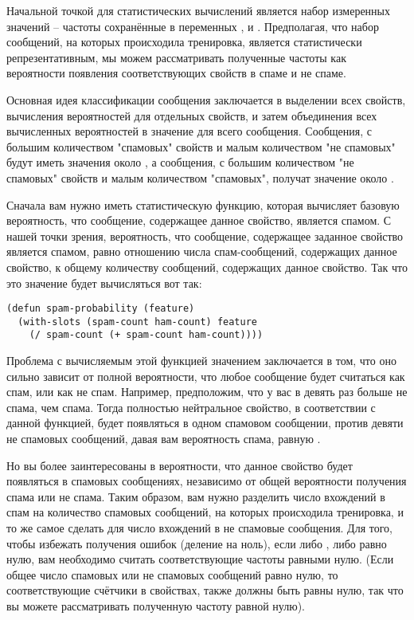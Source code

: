 Начальной точкой для статистических вычислений является набор измеренных значений --
частоты сохранённые в переменных ,  и
.  Предполагая, что набор сообщений, на которых происходила тренировка,
является статистически репрезентативным, мы можем рассматривать полученные частоты как
вероятности появления соответствующих свойств в спаме и не спаме.

Основная идея классификации сообщения заключается в выделении всех свойств, вычисления
вероятностей для отдельных свойств, и затем объединения всех вычисленных вероятностей в
значение для всего сообщения.  Сообщения, с большим количеством "спамовых" свойств и малым
количеством "не спамовых" будут иметь значения около , а сообщения, с большим
количеством "не спамовых" свойств и малым количеством "спамовых", получат значение около
.

Сначала вам нужно иметь статистическую функцию, которая вычисляет базовую вероятность, что
сообщение, содержащее данное свойство, является спамом.  С нашей точки зрения,
вероятность, что сообщение, содержащее заданное свойство является спамом, равно отношению
числа спам-сообщений, содержащих данное свойство, к общему количеству сообщений,
содержащих данное свойство.  Так что это значение будет вычисляться вот так:

\begin{lstlisting}
(defun spam-probability (feature)
  (with-slots (spam-count ham-count) feature
    (/ spam-count (+ spam-count ham-count))))
\end{lstlisting}

Проблема с вычисляемым этой функцией значением заключается в том, что оно сильно зависит
от полной вероятности, что любое сообщение будет считаться как спам, или как не спам.
Например, предположим, что у вас в девять раз больше не спама, чем спама.  Тогда полностью
нейтральное свойство, в соответствии с данной функцией, будет появляться в одном спамовом
сообщении, против девяти не спамовых сообщений, давая вам вероятность спама, равную
.

Но вы более заинтересованы в вероятности, что данное свойство будет появляться в спамовых
сообщениях, независимо от общей вероятности получения спама или не спама.  Таким образом,
вам нужно разделить число вхождений в спам на количество спамовых сообщений, на которых
происходила тренировка, и то же самое сделать для число вхождений в не спамовые сообщения.
Для того, чтобы избежать получения ошибок  (деление на ноль), если
либо , либо  равно нулю, вам необходимо считать
соответствующие частоты равными нулю. (Если общее число спамовых или не спамовых сообщений
равно нулю, то соответствующие счётчики в свойствах, также должны быть равны нулю, так что
вы можете рассматривать полученную частоту равной нулю).

